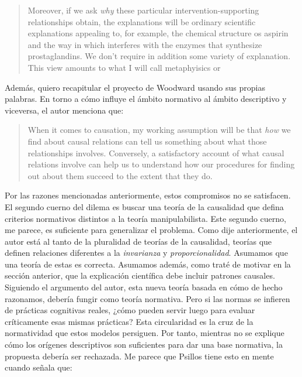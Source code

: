 \begin{quote}
  Moreover, if we ask \emph{why} these particular
  intervention-supporting relationships obtain, the
  explanations will be ordinary scientific explanations
  appealing to, for example, the chemical structure os
  aspirin and the way in which interferes with the enzymes
  that synthesize prostaglandins. We don't require in
  addition some variety of  explanation.
  This view amounts to what I will call 
  metaphyisics or 
  \parencite[p.~7]{caushuman} 
\end{quote}


Además, quiero recapitular el proyecto de Woodward usando
sus propias palabras. En torno a cómo influye el ámbito
normativo al ámbito descriptivo y viceversa, el autor
menciona que:

  \begin{quote}
    When it comes to causation, my working assumption will
    be that \emph{how} we find about causal relations can
    tell us something about what those relationships
    involves. Conversely, a satisfactory account of what
    causal relations involve can help us to understand how
    our procedures for finding out about them succeed to the
    extent that they do. 
    \parencite[Énfasis en el original,~][p.~10]{caushuman} 
  \end{quote}


Por las razones mencionadas anteriormente, estos compromisos
no se satisfacen. El segundo cuerno del dilema es buscar una
teoría de la causalidad que defina criterios normativos
distintos a la teoría manipulabilista. Este segundo cuerno,
me parece, es suficiente para generalizar el problema. Como
dije anteriormente, el autor está al tanto de la pluralidad
de teorías de la causalidad, teorías que definen relaciones
diferentes a la \emph{invarianza} y \emph{proporcionalidad}.
Asumamos que una teoría de estas es correcta. Asumamos
además, como traté de motivar en la sección anterior, que la
explicación científica debe incluir patrones causales.
Siguiendo el argumento del autor, esta nueva teoría basada
en cómo de hecho razonamos, debería fungir como teoría
normativa. Pero si las normas se infieren de prácticas
cognitivas reales, ¿cómo pueden servir luego para evaluar
críticamente esas mismas prácticas? Esta circularidad es la
cruz de la normatividad que estos modelos persiguen. Por
tanto, mientras no se explique cómo los orígenes
descriptivos son suficientes para dar una base normativa, la
propuesta debería ser rechazada. Me parece que Psillos tiene
esto en mente cuando señala que:

